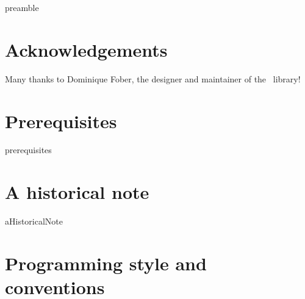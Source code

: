 \documentclass[12pt,a4paper]{article}
\begin{document}


{preamble}


\section{Acknowledgements}

Many thanks to Dominique Fober, the designer and maintainer of the \lib\ library!


\section{Prerequisites}

{prerequisites}


\section{A historical note}

{aHistoricalNote}


\section{Programming style and conventions}
\end{document}
